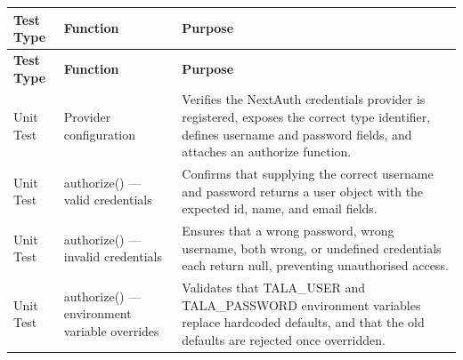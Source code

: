 \documentclass[12pt, letterpaper]{article}
\numberwithin{figure}{section}
\numberwithin{table}{section}
\begin{document}
\begin{center}
  \begin{singlespace}
    \small %

    \begin{longtable}{|
        >{\raggedright\arraybackslash}p{}|
        >{\raggedright\arraybackslash}p{}|
      >{\raggedright\arraybackslash}p{}|}

      \hline

      \rowcolor[gray]{0.9}
      \textbf{Test Type} & \textbf{Function} & \textbf{Purpose} \\ \hline
      \endfirsthead

      \hline
      \rowcolor[gray]{0.9}
      \textbf{Test Type} & \textbf{Function} & \textbf{Purpose} \\ \hline
      \endhead

      \hline
      \endfoot

      \hline
      \endlastfoot

      \rowcolor{white}
      Unit Test & Provider configuration & Verifies the NextAuth
      credentials provider is registered, exposes the correct type
      identifier, defines username and password fields, and attaches
      an authorize function. \\ \hline

      \rowcolor{white}
      Unit Test & authorize() — valid credentials & Confirms that
      supplying the correct username and password returns a user
      object with the expected id, name, and email fields. \\ \hline

      \rowcolor{white}
      Unit Test & authorize() — invalid credentials & Ensures that a
      wrong password, wrong username, both wrong, or undefined
      credentials each return null, preventing unauthorised access. \\ \hline

      \rowcolor{white}
      Unit Test & authorize() — environment variable overrides &
      Validates that TALA\_USER and TALA\_PASSWORD environment
      variables replace hardcoded defaults, and that the old defaults
      are rejected once overridden. \\ \hline


\end{longtable}
\end{singlespace}
\end{center}
\end{document}
